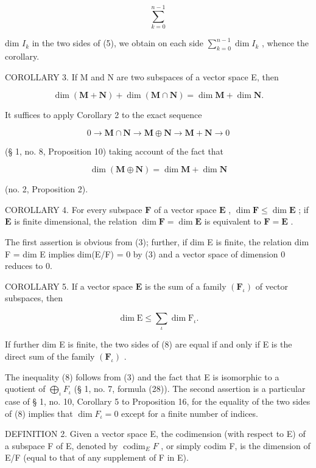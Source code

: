 \[
\sum_ {k = 0} ^ {n - 1}
\]

dim \(I_{k}\) in the two sides of (5), we obtain on each side \(\sum_{k=0}^{n-1}\dim I_{k}\) , whence the corollary.

COROLLARY 3. If M and N are two subspaces of a vector space E, then

\[
\dim (\mathbf {M} + \mathbf {N}) + \dim (\mathbf {M} \cap \mathbf {N}) = \dim \mathbf {M} + \dim \mathbf {N}.\tag{7}
\]

It suffices to apply Corollary 2 to the exact sequence

\[
0 \rightarrow \mathbf {M} \cap \mathbf {N} \rightarrow \mathbf {M} \oplus \mathbf {N} \rightarrow \mathbf {M} + \mathbf {N} \rightarrow 0
\]

(§ 1, no. 8, Proposition 10) taking account of the fact that

\[
\dim (\mathbf {M} \oplus \mathbf {N}) = \dim \mathbf {M} + \dim \mathbf {N}
\]

(no. 2, Proposition 2).

COROLLARY 4. For every subspace \(\mathbf{F}\) of a vector space \(\mathbf{E}\) , \(\dim \mathbf{F} \leqslant \dim \mathbf{E}\) ; if \(\mathbf{E}\) is finite dimensional, the relation \(\dim \mathbf{F} = \dim \mathbf{E}\) is equivalent to \(\mathbf{F} = \mathbf{E}\) .

The first assertion is obvious from (3); further, if dim E is finite, the relation dim F = dim E implies dim(E/F) = 0 by (3) and a vector space of dimension 0 reduces to 0.

COROLLARY 5. If a vector space \(\mathbf{E}\) is the sum of a family \((\mathbf{F}_{\iota})\) of vector subspaces, then

\[
\dim \mathrm{E} \leqslant \sum_ {\iota} \dim \mathrm{F} _ {\iota}.\tag{8}
\]

If further dim E is finite, the two sides of (8) are equal if and only if E is the direct sum of the family \((\mathbf{F}_{\iota})\) .

The inequality (8) follows from (3) and the fact that E is isomorphic to a quotient of \(\bigoplus_{\iota} F_{\iota}\) (§ 1, no. 7, formula (28)). The second assertion is a particular case of § 1, no. 10, Corollary 5 to Proposition 16, for the equality of the two sides of (8) implies that \(\dim F_{\iota} = 0\) except for a finite number of indices.

DEFINITION 2. Given a vector space E, the codimension (with respect to E) of a subspace F of E, denoted by \(\operatorname{codim}_{E} F\) , or simply codim F, is the dimension of E/F (equal to that of any supplement of F in E).

